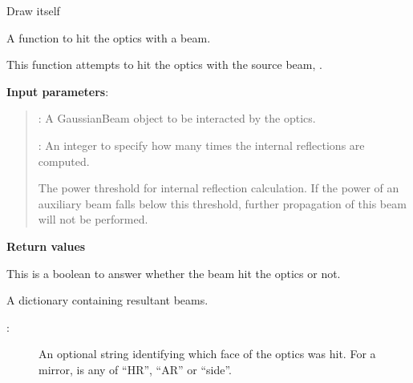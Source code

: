 \documentclass[letterpaper,10pt,english]{sphinxmanual}
\begin{document}
\begin{fulllineitems}
\begin{description}
\end{description}

\begin{fulllineitems}
\label{api/gtrace:gtrace.optcomp.Mirror.copy}
\end{fulllineitems}


\begin{fulllineitems}
\label{api/gtrace:gtrace.optcomp.Mirror.draw}
Draw itself

\end{fulllineitems}


\begin{fulllineitems}
\label{api/gtrace:gtrace.optcomp.Mirror.hit}
A function to hit the optics with a beam.

This function attempts to hit the optics with the source beam, .

\textbf{Input parameters}:
\begin{quote}

:
A GaussianBeam object to be interacted by the optics.

:
An integer to specify how many times the internal reflections
are computed.

The power threshold for internal reflection calculation.
If the power of an auxiliary beam falls below this threshold,
further propagation of this beam will not be performed.
\end{quote}

\textbf{Return values}

This is a boolean to answer whether the beam hit the optics
or not.

A dictionary containing resultant beams.
\begin{description}
\item[{:}] \leavevmode
An optional string identifying which face of the optics was hit.
For a mirror,  is any of ``HR'', ``AR'' or ``side''.

\end{description}


\end{fulllineitems}
\end{fulllineitems}
\end{document}
